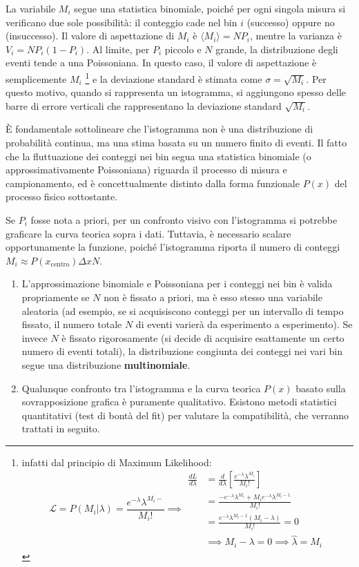 \documentclass[openany,a4paper,12pt]{book}
\theoremstyle{remark}
\begin{document}
La variabile $M_i$ segue una statistica binomiale, poiché per ogni singola misura si verificano due sole possibilità: il conteggio cade nel bin $i$ (successo) oppure no (insuccesso).
Il valore di aspettazione di $M_i$ è $\langle M_i \rangle = N P_i$, mentre la varianza è $V_i = N P_i (1-P_i)$.
Al limite, per $P_i$ piccolo e $N$ grande, la distribuzione degli eventi tende a una Poissoniana. In questo caso, il valore di aspettazione è semplicemente $M_i$ \footnote{infatti dal principio di Maximum Likelihood: \[
\mathcal{L}=P(M_i|\lambda)=\frac{e^{-\lambda}\lambda^{M_i-}}{M_i!} \implies 
\begin{aligned}
\frac{dL}{d\lambda} &= \frac{d}{d\lambda} \left[ \frac{e^{-\lambda} \lambda^{M_i}}{M_i!} \right] \\[10pt]
&= \frac{-e^{-\lambda} \lambda^{M_i} + M_i e^{-\lambda} \lambda^{M_i-1}}{M_i!} \\[10pt]
&= \frac{e^{-\lambda} \lambda^{M_i-1} (M_i - \lambda)}{M_i!} = 0 \\[10pt]
&\implies M_i - \lambda = 0 \implies \hat{\lambda} = M_i
\end{aligned}
\]}
 e la deviazione standard è stimata come $\sigma = \sqrt{M_i}$.
Per questo motivo, quando si rappresenta un istogramma, si aggiungono spesso delle barre di errore verticali che rappresentano la deviazione standard $\sqrt{M_i}$.

È fondamentale sottolineare che l'istogramma non è una distribuzione di probabilità continua, ma una stima basata su un numero finito di eventi. Il fatto che la fluttuazione dei conteggi nei bin segua una statistica binomiale (o approssimativamente Poissoniana) riguarda il processo di misura e campionamento, ed è concettualmente distinto dalla forma funzionale $P(x)$ del processo fisico sottostante.

Se $P_i$ fosse nota a priori, per un confronto visivo con l'istogramma si potrebbe graficare la curva teorica sopra i dati. Tuttavia, è necessario scalare opportunamente la funzione, poiché l'istogramma riporta il numero di conteggi $M_i \approx P(x_{\text{centro}}) \Delta x N$.

\begin{nota}
\begin{enumerate}
    \item L'approssimazione binomiale e Poissoniana per i conteggi nei bin è valida propriamente se $N$ non è fissato a priori, ma è esso stesso una variabile aleatoria (ad esempio, se si acquisiscono conteggi per un intervallo di tempo fissato, il numero totale $N$ di eventi varierà da esperimento a esperimento). Se invece $N$ è fissato rigorosamente (si decide di acquisire esattamente un certo numero di eventi totali), la distribuzione congiunta dei conteggi nei vari bin segue una distribuzione \textbf{multinomiale}.
    \item Qualunque confronto tra l'istogramma e la curva teorica $P(x)$ basato sulla sovrapposizione grafica è puramente qualitativo. Esistono metodi statistici quantitativi (test di bontà del fit) per valutare la compatibilità, che verranno trattati in seguito.
\end{enumerate}
\end{nota}
\end{document}
